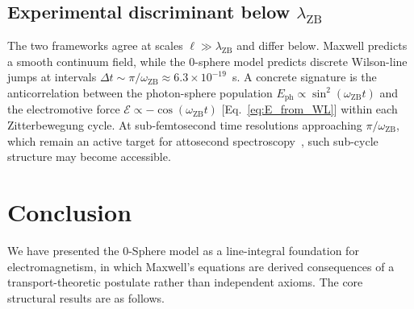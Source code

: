 \documentclass[%
 reprint, amsmath,amssymb, aps, prb, ]{revtex4-2}
\numberwithin{equation}{section}
\newcommand{\omZB}{\omega_{\text{ZB}}}
\newcommand{\EphS}{E_{\text{ph}}}
\begin{document}
\subsection{Experimental discriminant below $\lambda_{\text{ZB}}$}

The two frameworks agree at scales $\ell\gg\lambda_{\text{ZB}}$ and differ below. Maxwell predicts a smooth continuum field, while the 0-sphere model predicts discrete Wilson-line jumps at intervals $\Delta t \sim \pi/\omZB \approx 6.3\times10^{-19}$~s. A concrete signature is the anticorrelation between the photon-sphere population $\EphS\propto\sin^2(\omZB t)$ and the electromotive force $\mathcal{E}\propto-\cos(\omZB t)$ [Eq.~\eqref{eq:E_from_WL}] within each Zitterbewegung cycle. At sub-femtosecond time resolutions approaching $\pi/\omZB$, which remain an active target for attosecond spectroscopy~\cite{Krausz2009}, such sub-cycle structure may become accessible.

\section{Conclusion}
\label{sec:conclusion}

We have presented the 0-Sphere model as a line-integral foundation for electromagnetism, in which Maxwell's equations are derived consequences of a transport-theoretic postulate rather than independent axioms. The core structural results are as follows.
\end{document}
